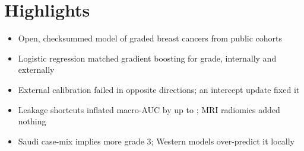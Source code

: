 \documentclass[12pt,a4paper]{article}
\begin{document}
\section*{Highlights}
\begin{itemize}
\item Open, checksummed model of \NGradedTotal{} graded breast cancers from \NGradedCohorts{} public cohorts
\item Logistic regression matched gradient boosting for grade, internally and externally
\item External calibration failed in opposite directions; an intercept update fixed it
\item Leakage shortcuts inflated macro-AUC by up to \LeakMaxInfl; MRI radiomics added nothing
\item Saudi case-mix implies more grade 3; Western models over-predict it locally
\end{itemize}
\end{document}
